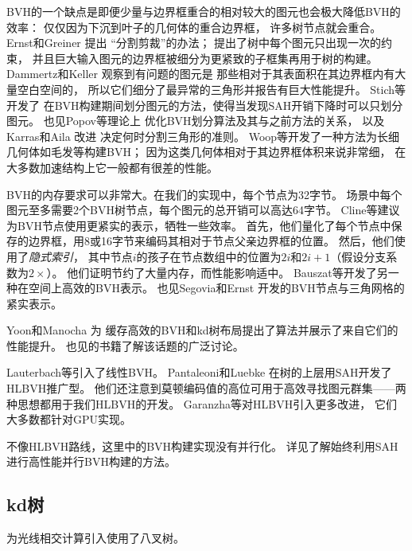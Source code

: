 BVH的一个缺点是即便少量与边界框重合的相对较大的图元也会极大降低BVH的效率：
仅仅因为下沉到叶子的几何体的重合边界框，
许多树节点就会重合。Ernst和Greiner \parencite*{4342593}提出
“分割剪裁”的办法；
提出了树中每个图元只出现一次的约束，
并且巨大输入图元的边界框被细分为更紧致的子框集再用于树的构建。
Dammertz和Keller \parencite*{4634636}观察到有问题的图元是
那些相对于其表面积在其边界框内有大量空白空间的，
所以它们细分了最异常的三角形并报告有巨大性能提升。
Stich等\parencite*{10.1145/1572769.1572771}开发了
在BVH构建期间划分图元的方法，使得当发现SAH开销下降时可以只划分图元。
也见Popov等\parencite*{10.1145/1572769.1572772}理论上
优化BVH划分算法及其与之前方法的关系，
以及Karras和Aila \parencite*{10.1145/2492045.2492055}改进
决定何时分割三角形的准则。
Woop等\parencite*{10.5555/2980009.2980014}开发了一种方法为长细几何体如毛发等构建BVH；
因为这类几何体相对于其边界框体积来说非常细，
在大多数加速结构上它一般都有很差的性能。

BVH的内存要求可以非常大。在我们的实现中，每个节点为32字节。
场景中每个图元至多需要2个BVH树节点，每个图元的总开销可以高达64字节。
Cline等\parencite*{10.5555/2383894.2383909}建议为BVH节点使用更紧实的表示，牺牲一些效率。
首先，他们量化了每个节点中保存的边界框，用8或16字节来编码其相对于节点父亲边界框的位置。
然后，他们使用了{\itshape 隐式索引}，
其中节点$i$的孩子在节点数组中的位置为$2i$和$2i+1$（假设分支系数为$2\times$）。
他们证明节约了大量内存，而性能影响适中。
Bauszat等\parencite*{10.2312:PE:VMV:VMV10:227-234}开发了另一种在空间上高效的BVH表示。
也见Segovia和Ernst \parencite*{10.5555/1839214.1839242}开发的BVH节点与三角网格的紧实表示。

Yoon和Manocha \parencite*{10.1111/j.1467-8659.2006.00970.x}为
缓存高效的BVH和kd树布局提出了算法并展示了来自它们的性能提升。
也见\citet{10.5555/1121584}的书籍了解该话题的广泛讨论。

Lauterbach等\parencite*{10.1111/j.1467-8659.2009.01377.x}引入了线性BVH。
Pantaleoni和Luebke \parencite*{10.5555/1921479.1921493}在树的上层用SAH开发了HLBVH推广型。
他们还注意到莫顿编码值的高位可用于高效寻找图元群集——两种思想都用于我们HLBVH的开发。
Garanzha等\parencite*{10.1145/2018323.2018333}对HLBVH引入更多改进，
它们大多数都针对GPU实现。

不像HLBVH路线，这里中的BVH构建实现没有并行化。
详见\citet{5669303}了解始终利用SAH进行高性能并行BVH构建的方法。

\subsection{kd树}\label{sub:kd树}
\citet{6429331}为光线相交计算引入使用了八叉树。